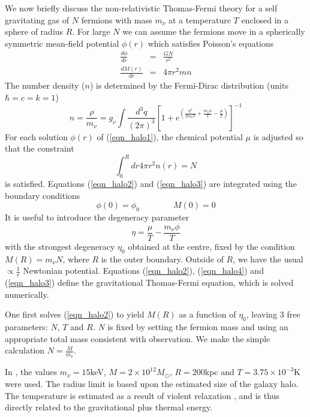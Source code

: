 We now briefly discuss the non-relativistic Thomas-Fermi theory for a self gravitating gas of $N$ fermions with mass $m_\nu$ at a
temperature $T$ enclosed in a sphere of radius $R$. For large $N$ we can assume the fermions move in a spherically symmetric mean-field
potential $\phi(r)$ which satisfies Poisson's equations
\begin{eqnarray}
	\frac{d\phi}{dr} &=& \frac{GN}{r^2}
	\label{eqn_halo1} \\
	\frac{dM(r)}{dr} &=& 4\pi r^2 m n
	\label{eqn_halo2}
\end{eqnarray}
The number density ($n$) is determined by the Fermi-Dirac distribution (units $\hbar=c=k=1$)
\begin{equation}
	n=\frac{\rho}{m_\nu}=g_\nu \int \frac{d^3q}{(2\pi)^3} \left[ 1+e^{\left(\frac{q^2}{2 m_\nu T} + \frac{m_\nu \phi}{T}
	- \frac{\mu}{T}\right)}\right]^{-1}
	\label{eqn_halo3}
\end{equation}
For each solution $\phi(r)$ of (\ref{eqn_halo1}), the chemical potential $\mu$ is adjusted so that the constraint
\begin{equation}
	\int^R_0 dr 4\pi r^2 n(r) = N
	\label{eqn_halo4}
\end{equation}
is satisfied. Equations (\ref{eqn_halo2}) and (\ref{eqn_halo3}) are integrated using the boundary conditions
\begin{equation}
	\phi(0)=\phi_0 \qquad \qquad M(0)=0
	\label{eqn_halobounds}
\end{equation}
It is useful to introduce the degeneracy parameter
\begin{equation}
	\eta = \frac{\mu}{T} - \frac{m_\nu \phi}{T}
	\label{eqn_halo5}
\end{equation}
with the strongest degeneracy $\eta_0$ obtained at the centre, fixed by the condition $M(R)=m_\nu N$, where $R$ is the outer boundary.
Outside of $R$, we have the usual $\propto \frac{1}{r}$ Newtonian potential.
Equations (\ref{eqn_halo2}), (\ref{eqn_halo4}) and (\ref{eqn_halo3}) define the gravitational Thomas-Fermi equation, which is solved numerically.

One first solves (\ref{eqn_halo2}) to yield $M(R)$ as a function of $\eta_0$, leaving 3 free parameters:
$N$, $T$ and $R$. $N$ is fixed by setting the fermion mass and using an appropriate total mass consistent with observation.
We make the simple calculation $N=\frac{M}{m_\nu}$.

In \cite{ref_halo}, the values $m_\nu=15$keV, $M=2 \times 10^{12} M_\odot$, $R=200$kpc and $T=3.75 \times 10^{-3}$K were used.
The radius limit is based upon the estimated size of the galaxy halo. The
temperature is estimated as a result of violent relaxation \cite{ref_haloviolentrelax}, and is thus
directly related to the gravitational plus thermal energy.

